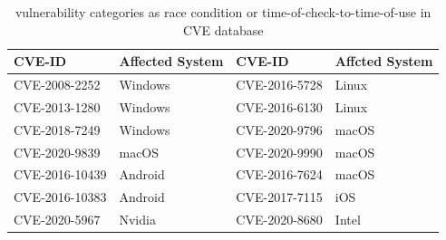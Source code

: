 \begin{center}
\begin{table}[ht]
\small
\caption{vulnerability categories as race condition or time-of-check-to-time-of-use in CVE database}
\label{table:cves}
\centering
	\begin{tabular}{@{}>{\raggedright\arraybackslash}m{2.30cm}@{}|
			@{}>{\centering\arraybackslash}m{1.30cm}@{}|
			@{}>{\centering\arraybackslash}m{2.30cm}@{}|
			@{}>{\centering\arraybackslash}m{1.20cm}@{} } 
\hline
CVE-ID & Affected System & CVE-ID & Affcted System \\ %
\hline
CVE-2008-2252  & Windows & CVE-2016-5728 & Linux \\
CVE-2013-1280  & Windows & CVE-2016-6130 & Linux \\
CVE-2018-7249  & Windows & CVE-2020-9796 & macOS \\ 
CVE-2020-9839  & macOS   & CVE-2020-9990 & macOS \\
CVE-2016-10439 & Android & CVE-2016-7624 & macOS \\
CVE-2016-10383 & Android & CVE-2017-7115 & iOS \\

CVE-2020-5967  & Nvidia  & CVE-2020-8680 & Intel \\
\hline

\end{tabular}
\end{table}
\end{center}






